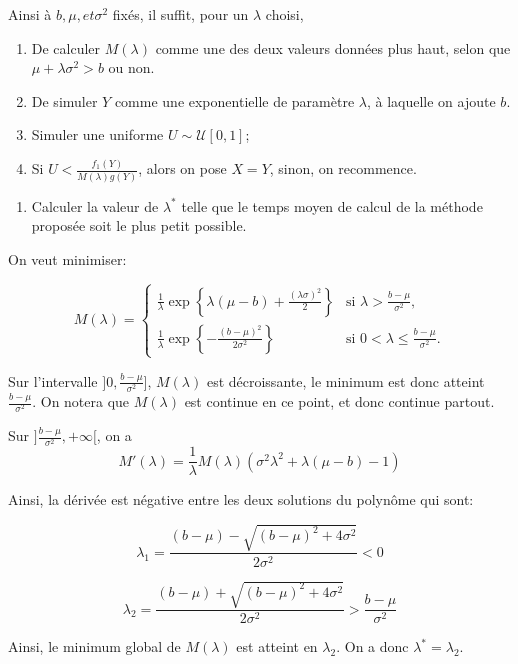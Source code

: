 \documentclass[]{article}
\providecommand{\tightlist}{%
  \setlength{\itemsep}{0pt}\setlength{\parskip}{0pt}}
\newenvironment{Correction}%
  { \vspace{\baselineskip}\begin{mdframed}[backgroundcolor=my_green]}%
  {\end{mdframed}}
\begin{document}
\begin{Correction}
Ainsi à $b, \mu, et \sigma^2$ fixés, il suffit, pour un $\lambda$ choisi,

\begin{enumerate}
\item De calculer $M(\lambda)$ comme une des deux valeurs données plus haut, selon
que $\mu + \lambda\sigma^2 > b$ ou non.
\item De simuler $Y$ comme une exponentielle de paramètre $\lambda$, à laquelle on ajoute
$b$.
\item Simuler une uniforme $U\sim \mathcal{U}[0, 1]$;
\item Si $U < \frac{f_1(Y)}{M(\lambda)g(Y)}$, alors on pose $X = Y$, sinon, on recommence.
\end{enumerate}
\end{Correction}

\begin{enumerate}
\def\labelenumi{\arabic{enumi}.}
\setcounter{enumi}{4}
\tightlist
\item
  Calculer la valeur de \(\lambda^*\) telle que le temps moyen de calcul
  de la méthode proposée soit le plus petit possible.
\end{enumerate}

\begin{Correction}
On veut minimiser:

$$M(\lambda) = \left\lbrace
\begin{array}{lr}
\frac{1}{\lambda}\exp\left\lbrace
    \lambda(\mu-b)+\frac{(\lambda\sigma)^2}{2}
    \right\rbrace & \text{si } \lambda > \frac{b - \mu}{\sigma^2},\\
    \frac{1}{\lambda}\exp\left\lbrace
    -\frac{(b-\mu)^2}{2\sigma^2}
    \right\rbrace & \text{si } 0< \lambda \leq \frac{b - \mu}{\sigma^2}.
\end{array}
\right. $$

Sur l'intervalle $]0, \frac{b - \mu}{\sigma^2}]$, $M(\lambda)$ est décroissante,
le minimum est donc atteint $\frac{b - \mu}{\sigma^2}$. On notera que
$M(\lambda)$ est continue en ce point, et donc continue partout.

Sur $]\frac{b - \mu}{\sigma^2}, +\infty[$, on a
$$M'(\lambda) = \frac{1}{\lambda}M(\lambda)\left(\sigma^2 \lambda^2 + \lambda(\mu -b) - 1\right)$$

Ainsi, la dérivée est négative entre les deux solutions du polynôme qui sont:

$$\lambda_1 = \frac{(b - \mu) - \sqrt{(b-\mu)^2 + 4\sigma^2}}{2 \sigma^2} < 0$$

$$\lambda_2 = \frac{(b - \mu) + \sqrt{(b-\mu)^2 + 4\sigma^2}}{2 \sigma^2} > \frac{b - \mu}{\sigma^2}$$

Ainsi, le minimum global de $M(\lambda)$ est atteint en $\lambda_2$.
On a donc $\lambda^* = \lambda_2$.
\end{Correction}
\end{document}
